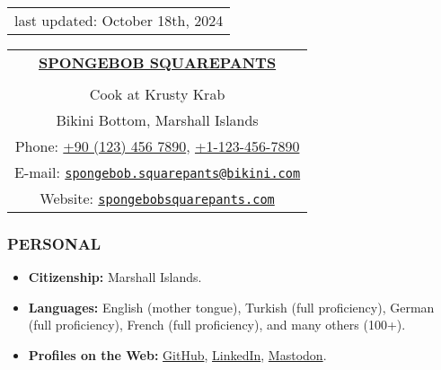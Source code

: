 \documentclass[11pt]{article}
\begin{document}
\null\hfill\begin{tabular}[t]{l@{}}
  \scriptsize \color{red} last updated: October 18th, 2024 \\
\end{tabular}

\begin{center}
\begin{tabular}{c}
 \large \underline{\textbf{SPONGEBOB SQUAREPANTS}}\\
 \\
 Cook at Krusty Krab\\
 Bikini Bottom, Marshall Islands\\
 Phone: \href{tel:+90 (123) 456 7890}{+90 (123) 456 7890}, \href{tel:+1-123-456-7890}{+1-123-456-7890}\\
 E-mail: \href{mailto:spongebob.squarepants@bikini.com}{\texttt{spongebob.squarepants@bikini.com}}\\
 Website: \href{https://spongebobsquarepants.com/}{\texttt{spongebobsquarepants.com}}
\end{tabular}
\end{center}

\vspace{-1em}

\subsubsection*{PERSONAL}
\begin{itemize}
    \item \textbf{Citizenship:} Marshall Islands.
    \item \textbf{Languages:} English (mother tongue), Turkish (full proficiency), German (full proficiency), French (full proficiency), and many others (100+).
    \item \textbf{Profiles on the Web:} \href{https://github.com/404}{GitHub}, \href{https://www.linkedin.com/in/404/}{LinkedIn}, \href{https://joinmastodon.org/}{Mastodon}.
\end{itemize}
\end{document}
